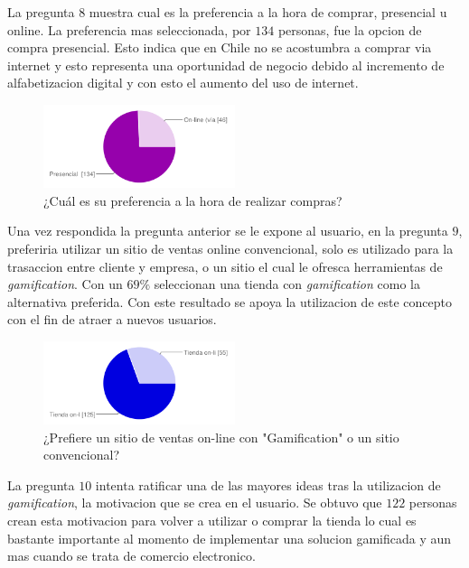 La pregunta $8$ muestra cual es la preferencia a la hora de comprar, presencial u online. La preferencia
mas seleccionada, por $134$ personas, fue la opcion de compra presencial. Esto indica que en Chile
no se acostumbra a comprar via internet y esto representa una oportunidad de negocio debido al
incremento de alfabetizacion digital y con esto el aumento del uso de internet.

\begin{figure}[!htb]
  \centering
  \includegraphics[width=0.5\textwidth]{images/chartPreg8.png}
  \caption[chart8]{¿Cuál es su preferencia a la hora de realizar compras?}
  \label{fig:chart2}
\end{figure}

Una vez respondida la pregunta anterior se le expone al usuario, en la pregunta $9$,  preferiria
utilizar un sitio de ventas online convencional, solo es utilizado para la trasaccion entre cliente
y empresa, o un sitio el cual le ofresca herramientas de \emph{gamification}. Con un $69\%$ seleccionan
una tienda con \emph{gamification} como la alternativa preferida. Con este resultado se apoya la
utilizacion de este concepto con el fin de atraer a nuevos usuarios.

\begin{figure}[!htb]
  \centering
  \includegraphics[width=0.5\textwidth]{images/chartPreg9.png}
  \caption[chart9]{¿Prefiere un sitio de ventas on-line con "Gamification" o un sitio convencional?}
  \label{fig:chart2}
\end{figure}

La pregunta $10$ intenta ratificar una de las mayores ideas tras la utilizacion de \emph{gamification},
la motivacion que se crea en el usuario. Se obtuvo que $122$ personas crean esta motivacion
para volver a utilizar o comprar la tienda lo cual es bastante importante al momento de implementar
una solucion gamificada y aun mas cuando se trata de comercio electronico.

